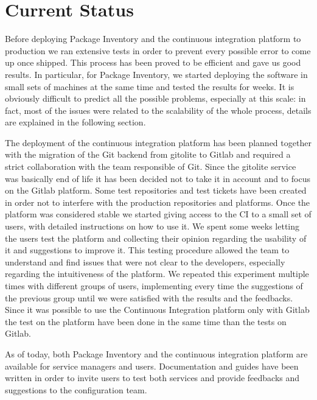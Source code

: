 \section{Current Status}

Before deploying Package Inventory and the continuous integration platform
to production we ran extensive tests in order to prevent every possible
error to come up once shipped. This process has been proved to be
efficient and gave us good results. In particular, for Package Inventory,
we started deploying the software in small sets of machines at the same
time and tested the results for weeks. It is obviously difficult to
predict all the possible problems, especially at this scale: in fact, most
of the issues were related to the scalability of the whole process,
details are explained in the following section.

The deployment of the continuous integration platform has been planned
together with the migration of the Git backend from gitolite to Gitlab and
required a strict collaboration with the team responsible of Git. Since
the gitolite service was basically end of life it has been decided not to
take it in account and to focus on the Gitlab platform. Some test
repositories and test tickets have been created in order not to interfere
with the production repositories and platforms. Once the platform was
considered stable we started giving access to the CI to a small set of
users, with detailed instructions on how to use it. We spent some weeks
letting the users test the platform and collecting their opinion regarding
the usability of it and suggestions to improve it. This testing procedure
allowed the team to understand and find issues that were not clear to the
developers, especially regarding the intuitiveness of the platform. We
repeated this experiment multiple times with different groups of users,
implementing every time the suggestions of the previous group until we
were satisfied with the results and the feedbacks. Since it was possible
to use the Continuous Integration platform only with Gitlab the test on
the platform have been done in the same time than the tests on Gitlab.

As of today, both Package Inventory and the continuous integration
platform are available for service managers and users. Documentation and
guides have been written in order to invite users to test both services
and provide feedbacks and suggestions to the configuration team.
